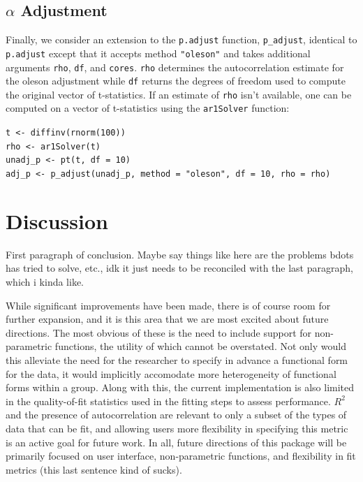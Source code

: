 \documentclass{article}
\begin{document}
\subsection{$\alpha$ Adjustment}

Finally, we consider an extension to the \texttt{p.adjust} function, \texttt{p\_adjust}, identical to \texttt{p.adjust} except that it accepts method \texttt{"oleson"} and takes additional arguments \texttt{rho}, \texttt{df}, and \texttt{cores}. \texttt{rho} determines the autocorrelation estimate for the oleson adjustment while \texttt{df} returns the degrees of freedom used to compute the original vector of t-statistics. If an estimate of \texttt{rho} isn't available, one can be computed on a vector of t-statistics using the \texttt{ar1Solver} function:

\begin{center}
\texttt{t <- diffinv(rnorm(100))} \\
\texttt{rho <- ar1Solver(t)} \\
\texttt{unadj\_p <- pt(t, df = 10)} \\
\texttt{adj\_p <- p\_adjust(unadj\_p, method = "oleson", df = 10, rho = rho)}
\end{center}




\section{Discussion}

First paragraph of conclusion. Maybe say things like here are the problems bdots has tried to solve, etc., idk it just needs to be reconciled with the last paragraph, which i kinda like.

While significant improvements have been made, there is of course room for further expansion, and it is this area that we are most excited about future directions. The most obvious of these is the need to include support for non-parametric functions, the utility of which cannot be overstated. Not only would this alleviate the need for the researcher to specify in advance a functional form for the data, it would implicitly accomodate more heterogeneity of functional forms within a group. Along with this, the current implementation is also limited in the quality-of-fit statistics used in the fitting steps to assess performance. $R^2$ and the presence of autocorrelation are relevant to only a subset of the types of data that can be fit, and allowing users more flexibility in specifying this metric is an active goal for future work. In all, future directions of this package will be primarily focused on user interface, non-parametric functions, and flexibility in fit metrics (this last sentence kind of sucks).
\end{document}
